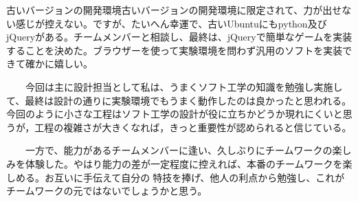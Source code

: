 
古いバージョンの開発環境古いバージョンの開発環境に限定されて、力が出せない感じが控えない。ですが、たいへん幸運で、古いUbuntuにもpython及びjQueryがある。チームメンバーと相談し、最終は、jQueryで簡単なゲームを実装することを決めた。ブラウザーを使って実験環境を問わず汎用のソフトを実装できて確かに嬉しい。

　　今回は主に設計担当として私は、うまくソフト工学の知識を勉強し実施して、最終は設計の通りに実験環境でもうまく動作したのは良かったと思われる。今回のように小さな工程はソフト工学の設計が役に立ちかどうか現れにくいと思うが，工程の複雑さが大きくなれば，きっと重要性が認められると信じている。

　　一方で、能力があるチームメンバーに逢い、久しぶりにチームワークの楽しみを体験した。やはり能力の差が一定程度に控えれば、本番のチームワークを楽しめる。お互いに手伝えて自分の特技を捧げ、他人の利点から勉強し、これがチームワークの元ではないでしょうかと思う。